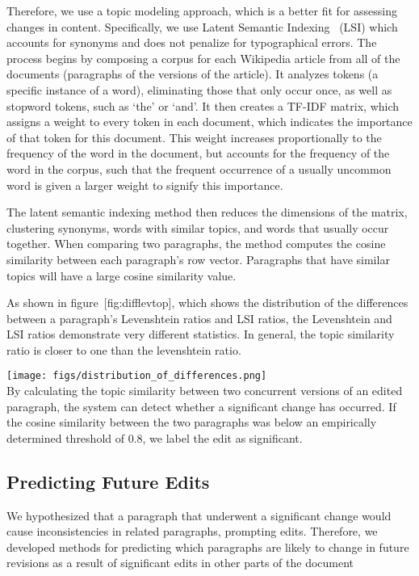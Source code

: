 Therefore, we use a topic modeling approach, which is a better fit for
assessing changes in content. Specifically, we use Latent Semantic
Indexing~\cite{deerwester1990indexing} (LSI) which accounts for synonyms
and does not penalize for typographical errors. The process begins by
composing a corpus for each Wikipedia article from all of the documents
(paragraphs of the versions of the article). It analyzes tokens (a
specific instance of a word), eliminating those that only occur once, as
well as stopword tokens, such as `the' or `and'. It then creates a
TF-IDF matrix, which assigns a weight to every token in each document,
which indicates the importance of that token for this document. This
weight increases proportionally to the frequency of the word in the
document, but accounts for the frequency of the word in the corpus, such
that the frequent occurrence of a usually uncommon word is given a
larger weight to signify this importance.

The latent semantic indexing method then reduces the dimensions of the
matrix, clustering synonyms, words with similar topics, and words that
usually occur together. When comparing two paragraphs, the method
computes the cosine similarity between each paragraph's row vector.
Paragraphs that have similar topics will have a large cosine similarity
value.

As shown in figure~{[}fig:difflevtop{]}, which shows the distribution of
the differences between a paragraph's Levenshtein ratios and LSI ratios,
the Levenshtein and LSI ratios demonstrate very different statistics. In
general, the topic similarity ratio is closer to one than the
levenshtein ratio.

\texttt{[image: figs/distribution\_of\_differences.png]}\\

By calculating the topic similarity between two concurrent versions of
an edited paragraph, the system can detect whether a significant change
has occurred. If the cosine similarity between the two paragraphs was
below an empirically determined threshold of 0.8, we label the edit as
significant.

\subsection{Predicting Future Edits}\label{predicting-future-edits}

We hypothesized that a paragraph that underwent a significant change
would cause inconsistencies in related paragraphs, prompting edits.
Therefore, we developed methods for predicting which paragraphs are
likely to change in future revisions as a result of significant edits in
other parts of the document

